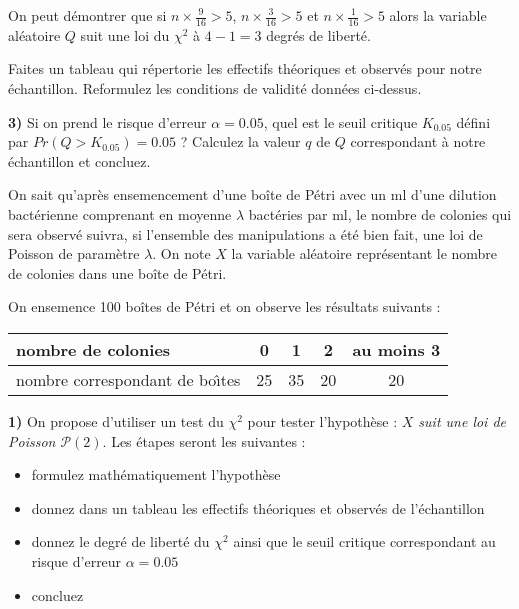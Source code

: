 \documentclass{article}
\numberwithin{equation}{section}
\begin{document}
On peut démontrer que si $n\times \frac{9}{16} >5$, $n\times \frac{3}{16} >5$ et $n\times \frac{1}{16} >5$ alors la
 variable aléatoire $Q$ suit une loi du $\chi^2$ \`a $4-1=3$ degrés de liberté.

Faites un tableau qui répertorie les effectifs théoriques et observés pour notre échantillon. Reformulez les conditions
de validité données ci-dessus.

{\bf 3)} Si on prend le risque d'erreur $\alpha=0.05$, quel est le seuil critique $K_{0.05}$ défini par $Pr(Q>K_{0.05})=0.05$ ? Calculez la valeur $q$ de $Q$ correspondant \`a notre échantillon et concluez.\\

\bigskip



On sait qu'après ensemencement d'une boîte de Pétri avec un ml d'une dilution bactérienne comprenant en moyenne
$\lambda$ bactéries par ml, le nombre de colonies qui sera observé suivra, si l'ensemble des manipulations a été bien 
fait, une loi de Poisson de paramètre $\lambda$. On note $X$ la variable aléatoire représentant le nombre de colonies
dans une boîte de Pétri.

On ensemence 100 boîtes de Pétri et on observe les résultats suivants :\\
\begin{center}
\begin{tabular}{|l|c|c|c|c|}
\hline
nombre de colonies & 0 & 1 & 2 & au moins 3 \\
\hline
nombre correspondant de bo\^{\i}tes & 25 & 35 & 20 & 20\\
\hline 
\end{tabular}
\end{center}

{\bf 1)} On propose d'utiliser un test du $\chi^2$ pour tester l'hypothèse : 
{\it $X$ suit une loi de Poisson $\mathcal{P}(2)$}. Les étapes seront les suivantes : 
\begin{itemize}
\item formulez mathématiquement l'hypothèse 
\item donnez dans un tableau les effectifs théoriques et observés de l'échantillon
\item donnez le degré de liberté du $\chi^2$ ainsi que le seuil critique correspondant au risque d'erreur $\alpha=0.05$
\item concluez
\end{itemize}
\end{document}
